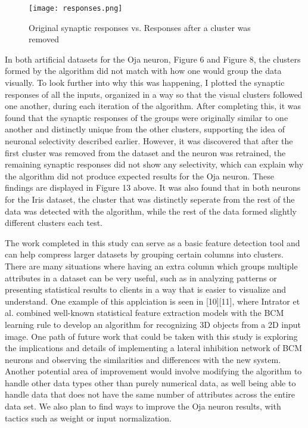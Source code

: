 \documentclass[10pt,twoside]{article}
\begin{document}
\begin{figure}[H]\small\centering\label{fig13}
\texttt{[image: responses.png]}
\caption{Original synaptic responses vs. Responses after a cluster was removed}
\end{figure}

In both artificial datasets for the Oja neuron, Figure 6 and Figure 8, the clusters formed by the algorithm did not match with how one would group the data visually.
To look further into why this was happening, I plotted the synaptic responses of all the inputs, organized in a way so that the visual clusters followed one another, during each iteration of the algorithm. After completing this, it was found that the synaptic responses of the groups were originally similar to one another and distinctly unique from the other clusters, 
supporting the idea of neuronal selectivity described earlier. However, it was discovered that after the first cluster was removed from the dataset and the neuron was retrained, the remaining synaptic responses did not show any selectivity, which can explain why the algorithm did not produce expected results for the Oja neuron. These findings are displayed in Figure 13 above. It was also found that in both neurons for the Iris dataset, the cluster that was distinctly seperate from the rest of the data was detected with the algorithm, while the rest of the data formed slightly different clusters each test. 

The work completed in this study can serve as a basic feature detection tool and can help
compress larger datasets by grouping certain columns into clusters. There are many situations where
having an extra column which groups multiple attributes in a dataset can be very useful, such as in analyzing patterns
or presenting statistical results to clients in a way that is easier to visualize and understand. One example of this applciation is seen in [10][11], where Intrator et al.      %
combined well-known statistical feature extraction models with the BCM learning rule to develop an
algorithm for recognizing 3D objects from a 2D input image.
One path of future work that could be taken with this study is exploring the implications and details of
implementing a lateral inhibition network of BCM neurons and observing the similarities and differences with the new system. Another potential area
of improvement would involve modifying the algorithm to handle other data types other than
purely numerical data, as well being able to handle data that does not have the same number of attributes across the
entire data set. We also plan to find ways to improve the Oja neuron results, with tactics such as weight or input normalization.
\end{document}
